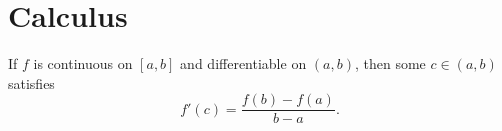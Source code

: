 \documentclass{article}
\begin{document}
\section{Calculus}
\begin{theorem}\label{thm:mvt}
If $f$ is continuous on $[a,b]$ and differentiable on $(a,b)$, then some
$c\in(a,b)$ satisfies
\[
  f'(c)=\frac{f(b)-f(a)}{b-a}.
\]
\end{theorem}
\end{document}
